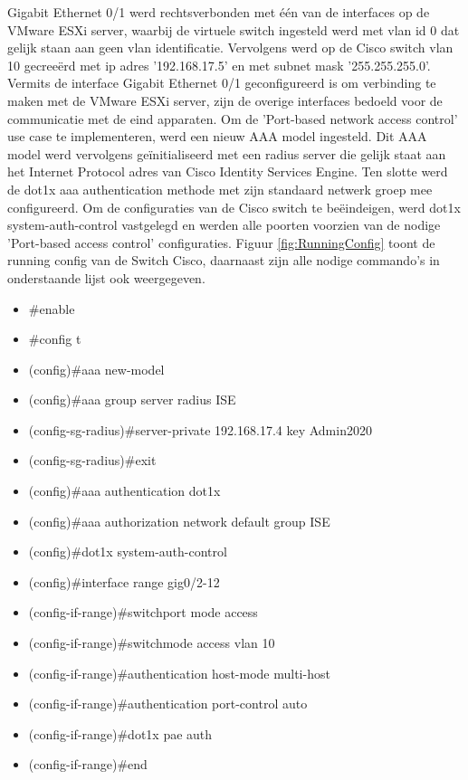 Gigabit Ethernet 0/1 werd rechtsverbonden met één van de interfaces op de VMware ESXi server, waarbij de virtuele switch ingesteld werd met vlan id 0 dat gelijk staan aan geen vlan identificatie. Vervolgens werd
op de Cisco switch vlan 10 gecreeërd met ip adres '192.168.17.5' en met subnet mask '255.255.255.0'. Vermits de interface Gigabit Ethernet 0/1 geconfigureerd is om verbinding te maken met de VMware ESXi server, zijn de overige interfaces bedoeld voor de communicatie met de eind apparaten. 
\newline
\newline
Om de 'Port-based network access control' use case te implementeren, werd een nieuw AAA model ingesteld. Dit AAA model werd vervolgens geïnitialiseerd met een radius server die gelijk staat aan het Internet Protocol adres van Cisco Identity Services Engine. Ten slotte werd de dot1x aaa authentication methode met zijn standaard netwerk groep mee configureerd. 
\newline
\newline
Om de configuraties van de Cisco switch te beëindeigen, werd dot1x system-auth-control vastgelegd en werden alle poorten voorzien van de nodige 'Port-based access control' configuraties. Figuur \ref{fig:RunningConfig} toont de running config van de Switch Cisco, daarnaast zijn alle nodige commando's in onderstaande lijst ook weergegeven.
\begin{itemize}
	\item \#enable
	\item \#config t
	\item (config)\#aaa new-model
	\item (config)\#aaa group server radius ISE
	\item (config-sg-radius)\#server-private 192.168.17.4 key Admin2020
	\item (config-sg-radius)\#exit
	\item (config)\#aaa authentication dot1x
	\item (config)\#aaa authorization network default group ISE
	\item (config)\#dot1x system-auth-control
	\item (config)\#interface range gig0/2-12
	\item (config-if-range)\#switchport mode access
	\item (config-if-range)\#switchmode access vlan 10
	\item (config-if-range)\#authentication host-mode multi-host
	\item (config-if-range)\#authentication port-control auto
	\item (config-if-range)\#dot1x pae auth
	\item (config-if-range)\#end
\end{itemize}

